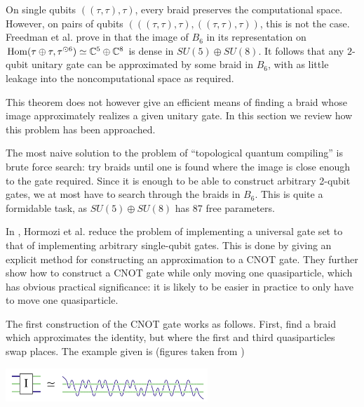 On single qubits $((\tau,\tau),\tau)$, every braid preserves the computational
space. However, on pairs of qubits $(((\tau,\tau),\tau), ((\tau,\tau),\tau))$,
this is not the case.  Freedman et al. prove in \cite{Freedman2000} that the
image of $B_6$ in its representation on $\operatorname{Hom}(\tau \oplus \tau, \tau^{\odot 6})
\simeq \mathbb{C}^5 \oplus \mathbb{C}^8$ is dense in $SU(5) \oplus SU(8)$. It
follows that any $2$-qubit unitary gate can be approximated by some braid in
$B_6$, with as little leakage into the noncomputational space as required. 


This theorem does not however give an efficient means of finding a braid whose
image approximately realizes a given unitary gate. In this section we review
how this problem has been approached.

The most naive solution to the problem of ``topological quantum compiling'' is
brute force search: try braids until one is found where the image is close
enough to the gate required. Since it is enough to be able to construct
arbitrary 2-qubit gates, we at most have to search through the braids in $B_6$.
This is quite a formidable task, as $SU(5) \oplus SU(8)$ has 87 free
parameters.

In \cite{Hormozi2007}, Hormozi et al. reduce the problem of implementing a
universal gate set to that of implementing arbitrary single-qubit gates.
This is done by giving an explicit method for constructing an approximation to
a CNOT gate. They further show how to construct a CNOT gate while only moving
one quasiparticle, which has obvious practical significance: it is likely to be
easier in practice to only have to move one quasiparticle.

The first construction of the CNOT gate works as follows. First, find a braid
which approximates the identity, but where the first and third quasiparticles
swap places. The example given is (figures taken from \cite{Hormozi2007})

\begin{center}
\includegraphics[width=3in]{I-small.png}
\end{center}

